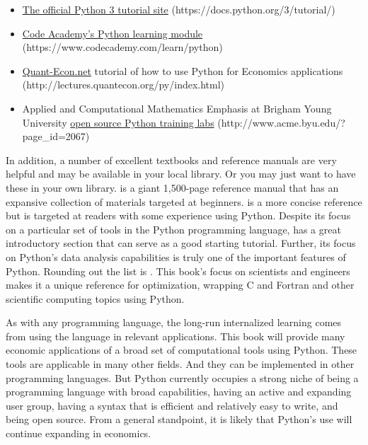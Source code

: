   \begin{itemize}
    \item \href{https://docs.python.org/3/tutorial/}{The official Python 3 tutorial site} (https://docs.python.org/3/tutorial/)
    \item \href{https://www.codecademy.com/learn/python}{Code Academy's Python learning module} (https://www.codecademy.com/learn/python)
    \item \href{http://lectures.quantecon.org/py/index.html}{Quant-Econ.net} tutorial of how to use Python for Economics applications (http://lectures.quantecon.org/py/index.html)
    \item Applied and Computational Mathematics Emphasis at Brigham Young University \href{http://www.acme.byu.edu/?page\_id=2067}{open source Python training labs} (http://www.acme.byu.edu/?page\_id=2067)
  \end{itemize}

  In addition, a number of excellent textbooks and reference manuals are very helpful and may be available in your local library. Or you may just want to have these in your own library. \citet{Lutz:2013} is a giant 1,500-page reference manual that has an expansive collection of materials targeted at beginners. \citet{Beazley:2009} is a more concise reference but is targeted at readers with some experience using Python. Despite its focus on a particular set of tools in the Python programming language, \citet{McKinney:2013} has a great introductory section that can serve as a good starting tutorial. Further, its focus on Python's data analysis capabilities is truly one of the important features of Python. Rounding out the list is \citet{Langtangen:2010}. This book's focus on scientists and engineers makes it a unique reference for optimization, wrapping C and Fortran and other scientific computing topics using Python.

  As with any programming language, the long-run internalized learning comes from using the language in relevant applications. This book will provide many economic applications of a broad set of computational tools using Python. These tools are applicable in many other fields. And they can be implemented in other programming languages. But Python currently occupies a strong niche of being a programming language with broad capabilities, having an active and expanding user group, having a syntax that is efficient and relatively easy to write, and being open source. From a general standpoint, it is likely that Python's use will continue expanding in economics.


